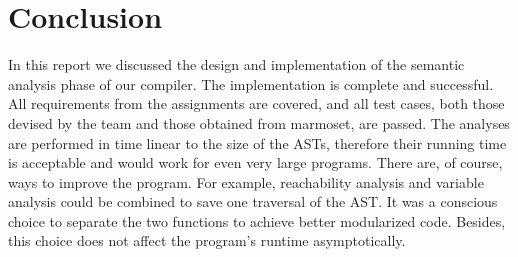 \documentclass[a4paper, notitlepage]{report}
\begin{document}
\chapter{Conclusion}
In this report we discussed the design and implementation of the semantic analysis phase of our compiler. The implementation is complete and successful. All requirements from the assignments are covered, and all test cases, both those devised by the team and those obtained from marmoset, are passed. The analyses are performed in time linear to the size of the ASTs, therefore their running time is acceptable and would work for even very large programs. There are, of course, ways to improve the program. For example, reachability analysis and variable analysis could be combined to save one traversal of the AST. It was a conscious choice to separate the two functions to achieve better modularized code. Besides, this choice does not affect the program's runtime asymptotically.




\end{document}
